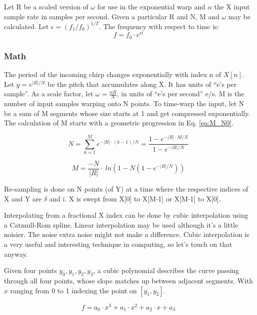Let R be a scaled version of $\omega$ for use in the exponential warp and
$\alpha$ the X input sample rate in samples per second.
Given a particular R and N, M and $\omega$ may be calculated.
Let $\epsilon = (f_1/f_0)^{1/T}$. The frequency with respect to time is:
\begin{equation}  \label{eq:fvsf0}
f = f_0 \cdot e^{\epsilon t}
\end{equation}

\subsubsection{Math}

The period of the incoming chirp changes exponentially with index n of $X[n]$.
Let $y = e^{|R|/N}$ be the pitch that accumulates along X.
It has units of ``e's per sample''.
As a scale factor, let $\omega = \frac{\alpha R}{N}$,
in units of ``e's per second'' e/s.
M is the number of input samples warping onto N points.
To time-warp the input, let N be a sum of M segments whose size starts at 1 and
get compressed exponentially. 
The calculation of M starts with a geometric progression in Eq. \ref{eq:M_N0}.

\begin{equation}  \label{eq:M_N0}
N = \sum_{k=1}^{M} e^{-|R| \cdot (k-1)/N} = \frac{1 - e^{-|R| \cdot M/N}}{1 - e^{-|R|/N}}
\end{equation}

\begin{equation}  \label{eq:M_N}
M = \frac{-N}{|R|} \cdot\ ln\left( 1 - N(1-e^{-|R|/N}) \right)
\end{equation}

Re-sampling is done on N points (of Y) at a time where the respective indices of
X and Y are $\delta$ and i.
X is swept from X[0] to X[M-1] or X[M-1] to X[0].

Interpolating from a fractional X index can be done by cubic interpolation
using a Catmull-Rom spline. 
Linear interpolation may be used although it's a little noisier.
The noise extra noise might not make a difference.
Cubic interpolation is a very useful and interesting technique in computing,
so let's touch on that anyway.

Given four points $y_0, y_1, y_2, y_3$, a cubic polynomial describes the curve
passing through all four points, whose slope matches up between adjacent segments.
With $x$ ranging from 0 to 1 indexing the point on $[y_1, y_2]$.

\begin{equation}  \label{eq:cubic}
f = a_0 \cdot x^3 + a_1 \cdot x^2 + a_2 \cdot x + a_3
\end{equation}

